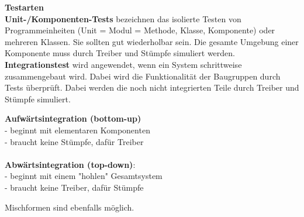 \textbf{Testarten} \\

\textbf{Unit-/Komponenten-Tests} bezeichnen das isolierte Testen von Programmeinheiten (Unit = Modul = Methode, Klasse, Komponente) oder mehreren Klassen. Sie sollten gut wiederholbar sein. Die gesamte Umgebung einer Komponente muss durch Treiber und Stümpfe simuliert werden. \\
\textbf{Integrationstest} wird angewendet, wenn ein System schrittweise zusammengebaut wird. Dabei wird die Funktionalität der Baugruppen durch Tests überprüft.  Dabei werden die noch nicht integrierten Teile durch Treiber und Stümpfe simuliert. \\ 
\begin{multicols}{2}
\textbf{Aufwärtsintegration (bottom-up)}\\
- beginnt mit elementaren Komponenten\\
- braucht keine Stümpfe, dafür Treiber \\
\columnbreak
\\
\textbf{Abwärtsintegration (top-down)}: \\
 - beginnt mit einem "hohlen" Gesamtsystem \\
 -  braucht keine Treiber, dafür Stümpfe
\end{multicols}
Mischformen sind ebenfalls möglich. 

